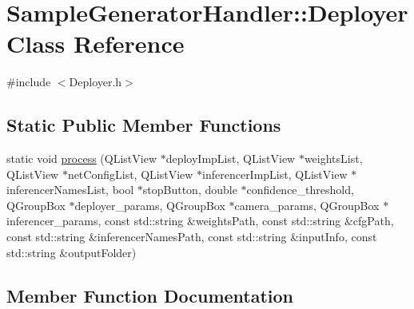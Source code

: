 \hypertarget{class_sample_generator_handler_1_1_deployer}{}\section{Sample\+Generator\+Handler\+:\+:Deployer Class Reference}
\label{class_sample_generator_handler_1_1_deployer}


{\ttfamily \#include $<$Deployer.\+h$>$}

\subsection*{Static Public Member Functions}
\begin{DoxyCompactItemize}
\item 
static void \hyperlink{class_sample_generator_handler_1_1_deployer_ad9964a4e64b6d51ce7cd63083929ac42}{process} (Q\+List\+View $\ast$deploy\+Imp\+List, Q\+List\+View $\ast$weights\+List, Q\+List\+View $\ast$net\+Config\+List, Q\+List\+View $\ast$inferencer\+Imp\+List, Q\+List\+View $\ast$inferencer\+Names\+List, bool $\ast$stop\+Button, double $\ast$confidence\+\_\+threshold, Q\+Group\+Box $\ast$deployer\+\_\+params, Q\+Group\+Box $\ast$camera\+\_\+params, Q\+Group\+Box $\ast$inferencer\+\_\+params, const std\+::string \&weights\+Path, const std\+::string \&cfg\+Path, const std\+::string \&inferencer\+Names\+Path, const std\+::string \&input\+Info, const std\+::string \&output\+Folder)
\end{DoxyCompactItemize}


\subsection{Member Function Documentation}
\mbox{\label{class_sample_generator_handler_1_1_deployer_ad9964a4e64b6d51ce7cd63083929ac42}} 
